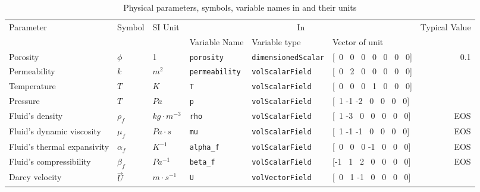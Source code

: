 \begin{sidewaystable}[htbp]
		\centering
		\onehalfspacing
		\begin{threeparttable}
			\caption{Physical parameters, symbols, variable names in \foam and their units}
			\label{tab:symbols}
			\begin{tabular}{llllllr}
				\toprule
				 \multirow{2}{*}{Parameter} & \multirow{2}{*}{Symbol} & \multirow{2}{*}{SI Unit} & \multicolumn{3}{c}{In \foam} & \multirow{2}{*}{Typical Value} \\
				 \cline{4-6}
				& & & Variable Name &Variable type& Vector of unit & \\
				\midrule
				Porosity & $\phi$ & 1 & \texttt{porosity} & \texttt{dimensionedScalar} & [\ 0 \ 0 \ 0 \ 0 \ 0 \ 0 \ 0] & 0.1 \\
				Permeability & $k$ & $m^2$ & \texttt{permeability} & \texttt{volScalarField} & [\ 0 \ 2 \ 0 \ 0 \ 0 \ 0 \ 0] \\
				Temperature & $T$ & $K$ & \texttt{T} & \texttt{volScalarField} & [\ 0 \ 0 \ 0 \ 1 \ 0 \ 0 \ 0] \\
				Pressure & $T$ & $Pa$ & \texttt{p} & \texttt{volScalarField} & [\ 1 -1 -2 \ 0 \ 0 \ 0 \ 0] \\
				Fluid's density & $\rho_f$ & $kg\cdot m^{-3}$ & \texttt{rho} & \texttt{volScalarField} & [\ 1 -3 \ 0 \ 0 \ 0 \ 0 \ 0] & EOS \\
				Fluid's dynamic viscosity & $\mu_f$ & $Pa\cdot s$ & \texttt{mu} & \texttt{volScalarField} & [\ 1 -1 -1 \ 0 \ 0 \ 0 \ 0] & EOS \\
				Fluid’s thermal expansivity & $\alpha_f$ & $K^{-1}$ & \texttt{alpha_f} & \texttt{volScalarField} & [\ 0 \ 0 \ 0 -1 \ 0 \ 0 \ 0] & EOS \\
				Fluid’s compressibility & $\beta_f$ & $Pa^{-1}$ & \texttt{beta_f} & \texttt{volScalarField} & [-1 \ 1 \ 2 \ 0 \ 0 \ 0 \ 0] & EOS \\
				Darcy velocity & $\vec{U}$ & $m\cdot s^{-1}$ & \texttt{U} & \texttt{volVectorField} & [\ 0 \ 1 -1 \ 0 \ 0 \ 0 \ 0] \\

\end{tabular}
\end{threeparttable}
\end{sidewaystable}
